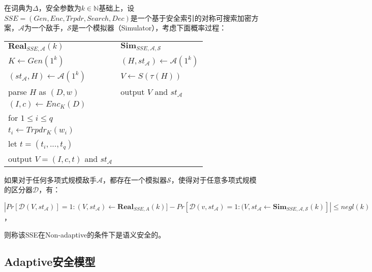 \begin{defn}
\label{defn:non_adaptive_semantic_security}
在词典为$\Delta$，安全参数为$k \in \mathbb{N}$基础上，设$SSE = (Gen, Enc, Trpdr, Search, Dec) $是一个基于安全索引的对称可搜索加密方案，$\mathcal{A}$为一个敌手，$\mathcal{S}$是一个模拟器（Simulator），考虑下面概率过程：
\begin{center}
\begin{tabular}{ l l }
    $\textbf{Real}_{SSE,\mathcal{A}}(k)$  &  $\textbf{Sim}_{SSE,\mathcal{A},\mathcal{S}}$    \\
    \quad $K \leftarrow Gen(1^k)$   &   \quad $(H,st_\mathcal{A}) \leftarrow \mathcal{A}(1^k)$ \\
    \quad $(st_\mathcal{A},H) \leftarrow \mathcal{A}(1^k)$ & \quad $V \leftarrow S(\tau (H))$ \\
    \quad parse $H$ as $(D,w)$          &   \quad output $V$ and $st_\mathcal{A}$             \\
    \quad $(I,c) \leftarrow Enc_K(D)$            &   \\
    \quad for $1 \leq i \leq q $                 &   \\
    \quad \quad $t_i \leftarrow Trpdr_K(w_i)$    &   \\
    \quad let $t = (t_i, ..., t_q)$              &    \\
    \quad output $V = (I,c,t)$ and $st_\mathcal{A}$    &
\end{tabular}
\end{center}
如果对于任何多项式规模敌手$\mathcal{A}$，都存在一个模拟器$\mathcal{S}$，使得对于任意多项式规模的区分器$\mathcal{D}$，有：
\begin{center}
$|Pr[\mathcal{D}(V,st_\mathcal{A})] = 1 : (V,st_\mathcal{A}) \leftarrow \textbf{Real}_{SSE,A}(k)] - Pr[\mathcal{D}(v,st_\mathcal{A})=1 : (V,st_\mathcal{A} \leftarrow \textbf{Sim}_{SSE,\mathcal{A},\mathcal{S}}(k)] | \leq negl(k)$，
\end{center}
则称该SSE在Non-adaptive的条件下是语义安全的。
\end{defn}




\subsection{\textbf{Adaptive安全模型}}
\label{sec:search_symm_security_model_adaptive}

